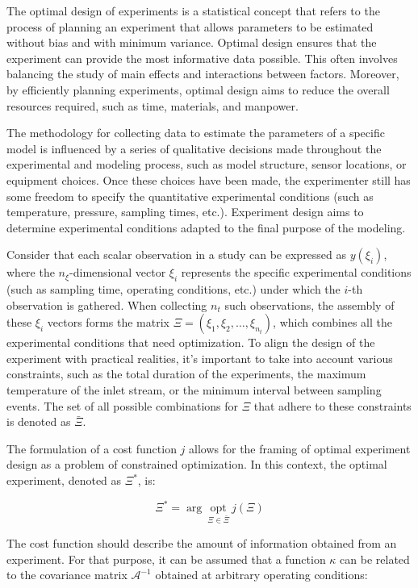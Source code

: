 \documentclass[../Article_Design_of_Experiment.tex]{subfiles}
\begin{document}
	The optimal design of experiments is a statistical concept that refers to the process of planning an experiment that allows parameters to be estimated without bias and with minimum variance. Optimal design ensures that the experiment can provide the most informative data possible. This often involves balancing the study of main effects and interactions between factors. Moreover, by efficiently planning experiments, optimal design aims to reduce the overall resources required, such as time, materials, and manpower.
	
	The methodology for collecting data to estimate the parameters of a specific model is influenced by a series of qualitative decisions made throughout the experimental and modeling process, such as model structure, sensor locations, or equipment choices. Once these choices have been made, the experimenter still has some freedom to specify the quantitative experimental conditions (such as temperature, pressure, sampling times, etc.). Experiment design aims to determine experimental conditions adapted to the final purpose of the modeling.
	
	Consider that each scalar observation in a study can be expressed as $y(\xi_i)$, where the $n_\xi$-dimensional vector $\xi_i$ represents the specific experimental conditions (such as sampling time, operating conditions, etc.) under which the $i$-th observation is gathered. When collecting $n_t$ such observations, the assembly of these $\xi_i$ vectors forms the matrix $\Xi = (\xi_1, \xi_2, \dots, \xi_{n_t})$, which combines all the experimental conditions that need optimization. To align the design of the experiment with practical realities, it's important to take into account various constraints, such as the total duration of the experiments, the maximum temperature of the inlet stream, or the minimum interval between sampling events. The set of all possible combinations for $\Xi$ that adhere to these constraints is denoted as $\bar{\Xi}$.
	
	The formulation of a cost function $j$ allows for the framing of optimal experiment design as a problem of constrained optimization. In this context, the optimal experiment, denoted as $\Xi^*$, is:
	
	{\footnotesize \begin{equation} \Xi^* = \arg~\underset{\Xi \in \bar{\Xi}}{\text{opt}}~j\left(\Xi\right) \end{equation} }
	
	The cost function should describe the amount of information obtained from an experiment. For that purpose, it can be assumed that a function $\kappa$ can be related to the covariance matrix $\mathcal{A}^{-1}$ obtained at arbitrary operating conditions:
	
\end{document}
